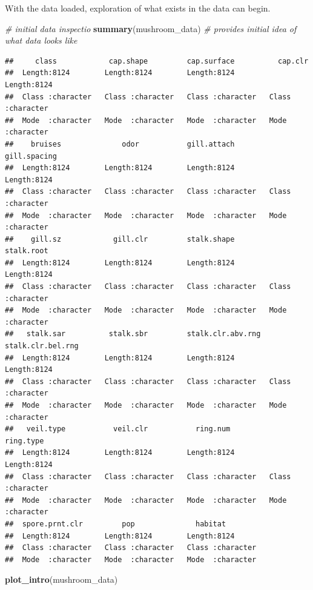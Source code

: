 \documentclass[
  english,
  man]{apa6}
\newenvironment{Shaded}{\begin{snugshade}}{\end{snugshade}}
\newcommand{\CommentTok}[1]{\textcolor[rgb]{0.56,0.35,0.01}{\textit{#1}}}
\newcommand{\KeywordTok}[1]{\textcolor[rgb]{0.13,0.29,0.53}{\textbf{#1}}}
\newcommand{\NormalTok}[1]{#1}
\begin{document}
With the data loaded, exploration of what exists in the data can begin.

\begin{Shaded}
\begin{Highlighting}[]
\CommentTok{# initial data inspectio}
\KeywordTok{summary}\NormalTok{(mushroom_data) }\CommentTok{# provides initial idea of what data looks like}
\end{Highlighting}
\end{Shaded}

\begin{verbatim}
##     class            cap.shape         cap.surface          cap.clr         
##  Length:8124        Length:8124        Length:8124        Length:8124       
##  Class :character   Class :character   Class :character   Class :character  
##  Mode  :character   Mode  :character   Mode  :character   Mode  :character  
##    bruises              odor           gill.attach        gill.spacing      
##  Length:8124        Length:8124        Length:8124        Length:8124       
##  Class :character   Class :character   Class :character   Class :character  
##  Mode  :character   Mode  :character   Mode  :character   Mode  :character  
##    gill.sz            gill.clr         stalk.shape         stalk.root       
##  Length:8124        Length:8124        Length:8124        Length:8124       
##  Class :character   Class :character   Class :character   Class :character  
##  Mode  :character   Mode  :character   Mode  :character   Mode  :character  
##   stalk.sar          stalk.sbr         stalk.clr.abv.rng  stalk.clr.bel.rng 
##  Length:8124        Length:8124        Length:8124        Length:8124       
##  Class :character   Class :character   Class :character   Class :character  
##  Mode  :character   Mode  :character   Mode  :character   Mode  :character  
##   veil.type           veil.clr           ring.num          ring.type        
##  Length:8124        Length:8124        Length:8124        Length:8124       
##  Class :character   Class :character   Class :character   Class :character  
##  Mode  :character   Mode  :character   Mode  :character   Mode  :character  
##  spore.prnt.clr         pop              habitat         
##  Length:8124        Length:8124        Length:8124       
##  Class :character   Class :character   Class :character  
##  Mode  :character   Mode  :character   Mode  :character
\end{verbatim}

\begin{Shaded}
\begin{Highlighting}[]
\KeywordTok{plot_intro}\NormalTok{(mushroom_data)}
\end{Highlighting}
\end{Shaded}
\end{document}
